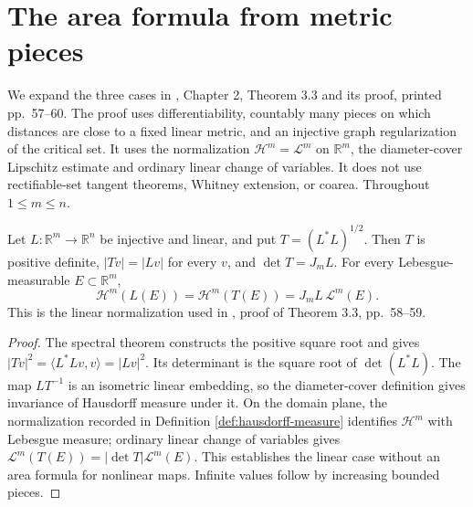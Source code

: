 \chapter{The area formula from metric pieces}\label{sec:euclidean-area-metric-proof}
We expand the three cases in \cite{Sim18}, Chapter 2, Theorem 3.3 and its proof, printed pp.~57--60. The proof uses differentiability, countably many pieces on which distances are close to a fixed linear metric, and an injective graph regularization of the critical set. It uses the normalization $\mathcal H^m=\mathcal L^m$ on $\mathbb R^m$, the diameter-cover Lipschitz estimate and ordinary linear change of variables. It does not use rectifiable-set tangent theorems, Whitney extension, or coarea. Throughout $1\leq m\leq n$.

\begin{lemma}\label{lem:area-positive-metric-factor}
Let $L:\mathbb R^m\to\mathbb R^n$ be injective and linear, and put $T=(L^*L)^{1/2}$. Then $T$ is positive definite, $|Tv|=|Lv|$ for every $v$, and $\det T=J_mL$. For every Lebesgue-measurable $E\subset\mathbb R^m$,
\[
 \mathcal H^m(L(E))=\mathcal H^m(T(E))=J_mL\,\mathcal L^m(E).
\]
This is the linear normalization used in \cite{Sim18}, proof of Theorem 3.3, pp.~58--59.
\end{lemma}
\begin{proof}
The spectral theorem constructs the positive square root and gives $|Tv|^2=\langle L^*Lv,v\rangle=|Lv|^2$. Its determinant is the square root of $\det(L^*L)$. The map $LT^{-1}$ is an isometric linear embedding, so the diameter-cover definition gives invariance of Hausdorff measure under it. On the domain plane, the normalization recorded in Definition \ref{def:hausdorff-measure} identifies $\mathcal H^m$ with Lebesgue measure; ordinary linear change of variables gives $\mathcal L^m(T(E))=|\det T|\mathcal L^m(E)$. This establishes the linear case without an area formula for nonlinear maps. Infinite values follow by increasing bounded pieces.
\end{proof}

